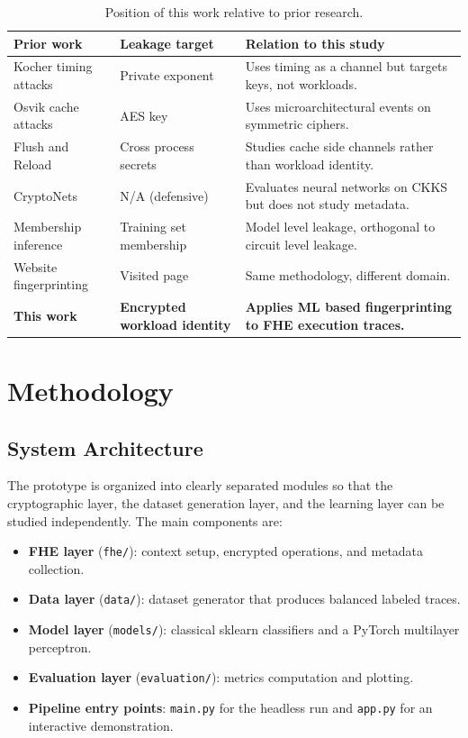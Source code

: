 \documentclass[12pt,a4paper]{article}
\begin{document}
\begin{table}[h]
\centering
\caption{Position of this work relative to prior research.}
\label{tab:priorwork}
\renewcommand{\arraystretch}{1.2}
\begin{tabular}{p{4cm}p{3.5cm}p{6cm}}
\toprule
\textbf{Prior work} & \textbf{Leakage target} & \textbf{Relation to this study} \\
\midrule
Kocher timing attacks \cite{kocher1996timing} & Private exponent & Uses timing as a channel but targets keys, not workloads. \\
Osvik cache attacks \cite{osvik2006cache} & AES key & Uses microarchitectural events on symmetric ciphers. \\
Flush and Reload \cite{yarom2014flush} & Cross process secrets & Studies cache side channels rather than workload identity. \\
CryptoNets \cite{gilad2016cryptonets} & N/A (defensive) & Evaluates neural networks on CKKS but does not study metadata. \\
Membership inference \cite{shokri2017membership} & Training set membership & Model level leakage, orthogonal to circuit level leakage. \\
Website fingerprinting \cite{panchenko2016website} & Visited page & Same methodology, different domain. \\
\textbf{This work} & \textbf{Encrypted workload identity} & \textbf{Applies ML based fingerprinting to FHE execution traces.} \\
\bottomrule
\end{tabular}
\end{table}

\section{Methodology}

\subsection{System Architecture}
The prototype is organized into clearly separated modules so that the cryptographic layer, the dataset generation layer, and the learning layer can be studied independently. The main components are:
\begin{itemize}[leftmargin=*]
  \item \textbf{FHE layer} (\texttt{fhe/}): context setup, encrypted operations, and metadata collection.
  \item \textbf{Data layer} (\texttt{data/}): dataset generator that produces balanced labeled traces.
  \item \textbf{Model layer} (\texttt{models/}): classical sklearn classifiers and a PyTorch multilayer perceptron.
  \item \textbf{Evaluation layer} (\texttt{evaluation/}): metrics computation and plotting.
  \item \textbf{Pipeline entry points}: \texttt{main.py} for the headless run and \texttt{app.py} for an interactive demonstration.
\end{itemize}
\end{document}
